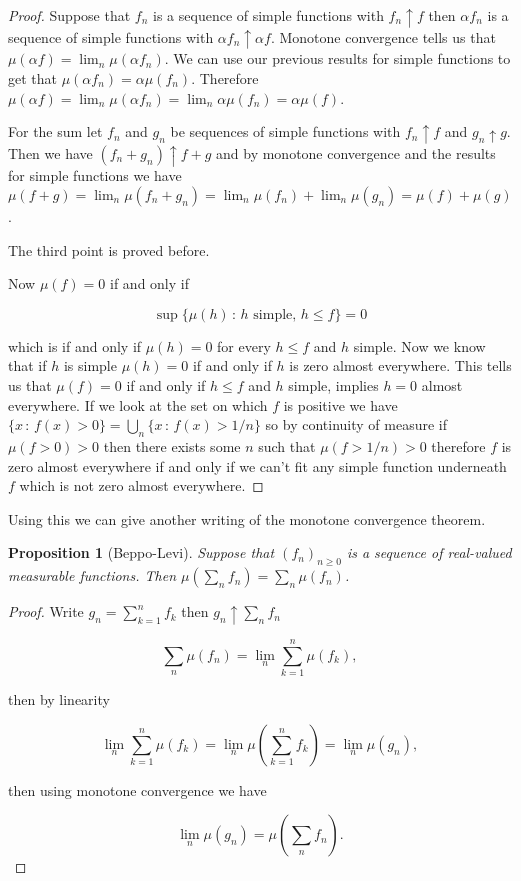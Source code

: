 \documentclass[
]{book}
\newtheorem{proposition}{Proposition}[chapter]
\theoremstyle{definition}
\theoremstyle{definition}
\theoremstyle{definition}
\theoremstyle{definition}
\theoremstyle{remark}
\begin{document}
\begin{proof}
Suppose that \(f_n\) is a sequence of simple functions with \(f_n \uparrow f\) then \(\alpha f_n\) is a sequence of simple functions with \(\alpha f_n \uparrow \alpha f\). Monotone convergence tells us that \(\mu(\alpha f) = \lim_n \mu(\alpha f_n)\). We can use our previous results for simple functions to get that \(\mu(\alpha f_n) = \alpha \mu(f_n)\). Therefore \(\mu(\alpha f) = \lim_n \mu(\alpha f_n) = \lim_n \alpha \mu(f_n) = \alpha \mu(f)\).

For the sum let \(f_n\) and \(g_n\) be sequences of simple functions with \(f_n \uparrow f\) and \(g_n \uparrow g\). Then we have \((f_n + g_n) \uparrow f+g\) and by monotone convergence and the results for simple functions we have \(\mu(f+g) = \lim_n \mu(f_n + g_n) = \lim_n \mu(f_n) + \lim_n \mu(g_n) = \mu(f) + \mu(g)\).

The third point is proved before.

Now \(\mu(f) = 0\) if and only if

\[\sup\{ \mu(h) \,:\, \mbox{$h$ simple},\, h \leq f\} = 0\]

which is if and only if \(\mu(h) = 0\) for every \(h \leq f\) and \(h\) simple. Now we know that if \(h\) is simple \(\mu(h) = 0\) if and only if \(h\) is zero almost everywhere. This tells us that \(\mu(f) = 0\) if and only if \(h \leq f\) and \(h\) simple, implies \(h = 0\) almost everywhere. If we look at the set on which \(f\) is positive we have \(\{x\,:\, f(x)>0\} = \bigcup_n \{ x \,:\, f(x) > 1/n\}\) so by continuity of measure if \(\mu( f>0)>0\) then there exists some \(n\) such that \(\mu(f >1/n)>0\) therefore \(f\) is zero almost everywhere if and only if we can't fit any simple function underneath \(f\) which is not zero almost everywhere.
\end{proof}

Using this we can give another writing of the monotone convergence theorem.

\begin{proposition}[Beppo-Levi]
Suppose that \((f_n)_{n \geq 0}\) is a sequence of real-valued measurable functions. Then \(\mu(\sum_n f_n) = \sum_n \mu(f_n)\).
\end{proposition}

\begin{proof}
Write \(g_n = \sum_{k=1}^n f_k\) then \(g_n \uparrow \sum_n f_n\)

\[  \sum_n \mu(f_n) = \lim_n \sum_{k=1}^n \mu(f_k),\]

then by linearity

\[ \lim_n \sum_{k=1}^n \mu(f_k) = \lim_n \mu(\sum_{k=1}^n f_k) = \lim_n \mu(g_n), \]

then using monotone convergence we have

\[ \lim_n \mu(g_n) = \mu(\sum_n f_n). \]
\end{proof}
\end{document}
